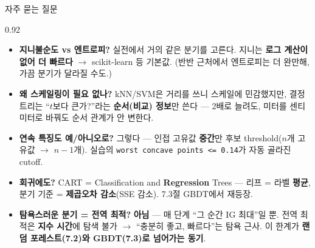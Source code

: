 \begin{frame}{자주 묻는 질문}
\begin{center}\begin{varwidth}{0.92\textwidth}
  \small
  \begin{itemize}
    \item \textbf{지니불순도 vs 엔트로피?} 실전에서 거의 같은 분기를 고른다.
      지니는 \textbf{로그 계산이 없어 더 빠르다} $\to$ scikit-learn 등
      기본값. (반반 근처에서 엔트로피는 더 완만해, 가끔 분기가 달라질
      수도.)
    \item \textbf{왜 스케일링이 필요 없나?} kNN/SVM은 거리를 쓰니
      스케일에 민감했지만, 결정 트리는 ``$t$보다 큰가?''라는
      \textbf{순서(비교) 정보}만 쓴다 — 2배로 늘려도, 미터를 센티미터로
      바꿔도 순서 관계가 안 변한다.
    \item \textbf{연속 특징도 예/아니오로?} 그렇다 — 인접 고유값 \textbf{중간}만
      후보 threshold($n$개 고유값 $\to$ $n-1$개). 실습의
      \texttt{worst concave points <= 0.14}가 자동 골라진 cutoff.
    \item \textbf{회귀에도?} CART = Classification and \textbf{Regression}
      Trees — 리프 = 라벨 \textbf{평균}, 분기 기준 = \textbf{제곱오차
      감소}(SSE 감소). 7.3절 GBDT에서 재등장.
    \item \textbf{탐욕스러운 분기 = 전역 최적?} \textbf{아님} — 매 단계
      ``그 순간 IG 최대''일 뿐. 전역 최적은 \textbf{지수 시간}에 탐색
      불가 $\to$ ``충분히 좋고, 빠르다''는 탐욕 근사. 이 한계가
      \textbf{랜덤 포레스트(7.2)와 GBDT(7.3)로 넘어가는 동기}.
  \end{itemize}
\end{varwidth}\end{center}
\end{frame}
